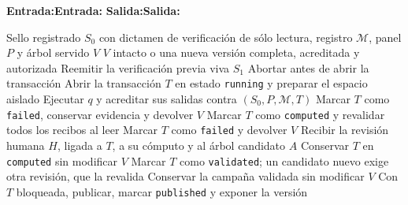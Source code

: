 \documentclass[12pt,letterpaper]{report}
\renewcommand{\algorithmicrequire}{\textbf{Entrada:}}
\renewcommand{\algorithmicensure}{\textbf{Salida:}}
\begin{document}
\begingroup
\algrenewcommand\algorithmicrequire{\textbf{Entrada:}}
\algrenewcommand\algorithmicensure{\textbf{Salida:}}
\algrenewcommand{}
\algrenewcommand{}
\algrenewcommand{}
\algrenewcommand{}
\algrenewcommand{}
\begin{algorithm}[htbp]
\caption{Cierre operacional y publicación acreditada}
\label{alg:cierre_a10}
\begin{algorithmic}[1]
\Require Sello registrado $S_0$ con dictamen de verificación de sólo lectura, registro $\mathcal{M}$,
panel $P$ y árbol servido $V$
\Ensure $V$ intacto o una nueva versión completa, acreditada y autorizada
\State Reemitir la verificación previa viva $S_1$
  \State Abortar antes de abrir la transacción
\EndIf
\State Abrir la transacción $T$ en estado \texttt{running} y preparar el espacio aislado
  \State Ejecutar $q$ y acreditar sus salidas contra $(S_0,P,\mathcal{M},T)$
    \State Marcar $T$ como \texttt{failed}, conservar evidencia y devolver $V$
  \EndIf
\EndFor
\State Marcar $T$ como \texttt{computed} y revalidar todos los recibos al leer
  \State Marcar $T$ como \texttt{failed} y devolver $V$
\EndIf
\State Recibir la revisión humana $H$, ligada a $T$, a su cómputo y al árbol candidato $A$
  \State Conservar $T$ en \texttt{computed} sin modificar $V$
\Else
  \State Marcar $T$ como \texttt{validated}; un candidato nuevo exige otra revisión, que la revalida
    \State Conservar la campaña validada sin modificar $V$
  \Else
    \State Con $T$ bloqueada, publicar, marcar \texttt{published} y exponer la versión
  \EndIf
\EndIf
\end{algorithmic}
\end{algorithm}
\endgroup
\end{document}
